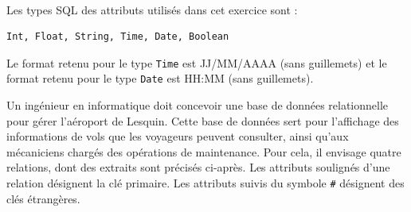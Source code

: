 \documentclass[11pt,a4paper,french,twoside]{PMCours}
\begin{document}
\ \\
Les types SQL des attributs utilisés dans cet exercice sont : 
\begin{verbatim}
Int, Float, String, Time, Date, Boolean
\end{verbatim} 
Le format retenu pour le type \verb'Time' est JJ/MM/AAAA (sans guillemets) et 
le format retenu pour le type \verb'Date' est HH:MM (sans guillemets).

\medskip
Un ingénieur en informatique doit concevoir une base de données relationnelle pour gérer l'aéroport de Lesquin. Cette base de données sert pour l'affichage des informations de vols que les voyageurs peuvent consulter, ainsi qu'aux mécaniciens chargés des opérations de maintenance. Pour cela, il envisage quatre relations, dont des extraits sont précisés ci-après. Les attributs soulignés d'une relation désignent la clé primaire. Les attributs suivis du symbole \verb'#' désignent des clés étrangères.
\end{document}
